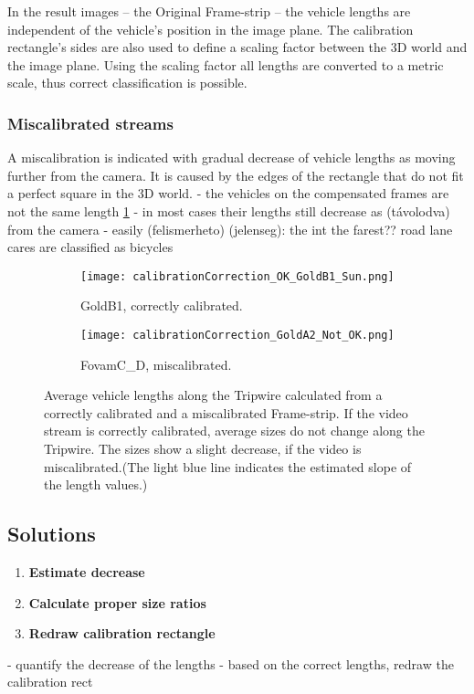 In the result images -- the Original Frame-strip -- the vehicle lengths are independent of the vehicle's position in the image plane. 
The calibration rectangle's sides are also used to define a scaling factor between the 3D world and the image plane.
Using the scaling factor all lengths are converted to a metric scale, thus correct classification is possible.

\subsubsection{Miscalibrated streams}
A miscalibration is indicated with gradual decrease of vehicle lengths as moving further from the camera.
It is caused by the edges of the rectangle that do not fit a perfect square in the 3D world.
- the vehicles on the compensated frames are not the same length \ref{fig:calibrations}
- in most cases their lengths still decrease as (távolodva) from the camera
- easily (felismerheto) (jelenseg): the int the farest?? road lane cares are classified as bicycles

\begin{figure}[!t]
	\centering
	\begin{subfigure}[b]{0.4\textwidth}
		\texttt{[image: calibrationCorrection\_OK\_GoldB1\_Sun.png]}
		\caption{GoldB1, correctly calibrated.}
	\end{subfigure}
	\quad
	\begin{subfigure}[b]{0.4\textwidth}
		\texttt{[image: calibrationCorrection\_GoldA2\_Not\_OK.png]}
		\caption{FovamC\_D, miscalibrated.}
	\end{subfigure}

	\caption{Average vehicle lengths along the Tripwire calculated from a correctly calibrated and a miscalibrated Frame-strip. If the video stream is correctly calibrated, average sizes do not change along the Tripwire. The sizes show a slight decrease, if the video is miscalibrated.(The light blue line indicates the estimated slope of the length values.)\label{fig:calibrations}}
\end{figure}

\subsection{Solutions}
\begin{enumerate}
	\item  \textbf{Estimate decrease}
	\item  \textbf{Calculate proper size ratios}
	\item  \textbf{Redraw calibration rectangle}
\end{enumerate}
- quantify the decrease of the lengths
- based on the correct lengths, redraw the calibration rect

